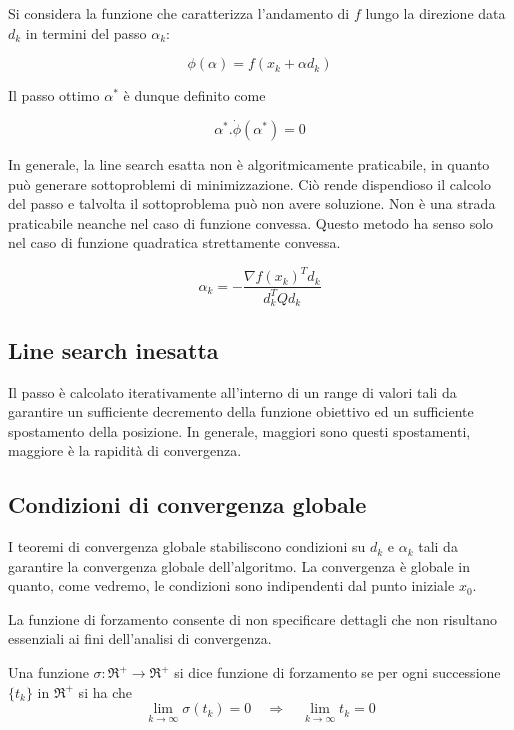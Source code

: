 Si considera la funzione che caratterizza l'andamento di $f$ lungo la direzione data $d_{k}$ in termini del passo $\alpha_{k}$:

\begin{equation*}
	\label{eqn:fi-alfa}
	\phi (\alpha)=f(x_{k} + \alpha d_{k})
\end{equation*}

Il passo ottimo $\alpha^{*}$ è dunque definito come

\begin{equation}
	\label{eqn:optimal-pace}
	\alpha^{*}.\dot{\phi}(\alpha^{*})=0
\end{equation}

In generale, la line search esatta non è algoritmicamente praticabile, in quanto può generare sottoproblemi di minimizzazione. Ciò rende dispendioso il calcolo del passo e talvolta il sottoproblema può non avere soluzione.
Non è una strada praticabile neanche nel caso di funzione convessa. Questo metodo ha senso solo nel caso di funzione quadratica strettamente convessa.

\begin{equation}
	\label{eqn:optimal-pace-quadratic-convex}
	\alpha_{k}=-\frac{\nabla f(x_{k})^{T}d_{k}}{d_{k}^{T}Qd_{k}}
\end{equation}


\subsection{Line search inesatta}
Il passo è calcolato iterativamente all'interno di un range di valori tali da garantire un sufficiente decremento della funzione obiettivo ed un sufficiente spostamento della posizione. In generale, maggiori sono questi spostamenti, maggiore è la rapidità di convergenza.


\subsection{Condizioni di convergenza globale}

I teoremi di convergenza globale stabiliscono condizioni su $d_{k}$ e $\alpha_{k}$ tali da garantire la convergenza globale dell'algoritmo.
La convergenza è globale in quanto, come vedremo, le condizioni sono indipendenti dal punto iniziale $x_{0}$.

La funzione di forzamento consente di non specificare dettagli che non risultano essenziali ai fini dell'analisi di convergenza.

\begin{definition}
	\label{dfn:forcing-function}
	Una funzione $\sigma:\Re^{+}\rightarrow\Re^{+}$ si dice funzione di forzamento se per ogni successione $\{t_{k}\}$ in $\Re^{+}$ si ha che
	\begin{equation}
		\label{eqn:forcing-function}
		\lim_{k\rightarrow\infty}\sigma(t_{k})=0 \quad\Rightarrow\quad
		\lim_{k\rightarrow\infty}t_{k}=0
	\end{equation}
\end{definition}

